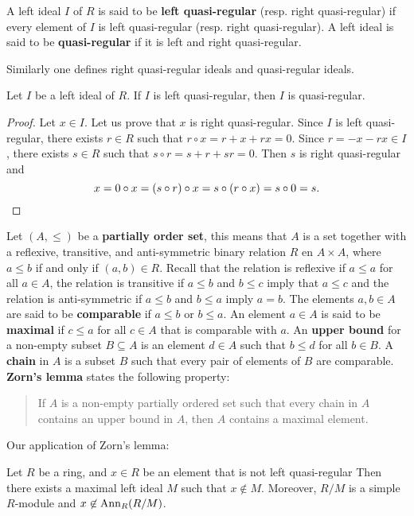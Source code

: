\begin{definition}
A left ideal $I$ of $R$ is said to be 
\textbf{left quasi-regular} (resp. right quasi-regular) if every element of $I$ is
left quasi-regular (resp. right quasi-regular). A left ideal 
is said to be \textbf{quasi-regular} if it is left and right quasi-regular. 
\end{definition}

Similarly 
one defines right quasi-regular ideals and quasi-regular ideals. 

\begin{lemma}
	\label{lemma:casiregular}
	Let $I$ be a left ideal of $R$. If $I$ is left quasi-regular, then 
	$I$ is quasi-regular.
\end{lemma}

\begin{proof}
	Let $x\in I$. Let us prove that $x$ is right quasi-regular. Since $I$ is
	left quasi-regular, there exists $r\in R$ such that $r\circ x=r+x+rx=0$. Since 
	$r=-x-rx\in I$, there exists $s\in R$ such that $s\circ
	r=s+r+sr=0$. Then $s$ is right quasi-regular and  
	\[
	x=0\circ x=(s\circ r)\circ x=s\circ (r\circ x)=s\circ 0=s.\qedhere
	\]
\end{proof}

Let $(A,\leq)$ be a \textbf{partially order set}, this means that $A$ is a set together with a 
reflexive, transitive, and anti-symmetric binary relation
$R$ en $A\times A$, where $a\leq b$ if and only if $(a,b)\in R$. 
Recall that the relation is reflexive if $a\leq a$ for all $a\in A$, the relation is transitive if 
$a\leq b$ and $b\leq c$ imply that 
$a\leq c$ and the relation is anti-symmetric if $a\leq b$ and $b\leq a$ imply $a=b$.
The elements $a,b\in A$ are said to be \textbf{comparable} if $a\leq b$ or $b\leq
a$. An element $a\in A$ is said to be \textbf{maximal} if 
$c\leq a$ 
for all $c\in A$
that is comparable with $a$. 
An \textbf{upper bound} for a non-empty subset $B\subseteq A$ is an element $d\in
A$ such that $b\leq d$ for all $b\in B$. A \textbf{chain} in $A$ is a subset 
$B$ such that every pair of elements of $B$ are comparable. 
\textbf{Zorn's lemma} states the following property: 
\begin{quote}
If $A$ is a non-empty partially ordered set such that every chain in 
$A$ contains an upper bound in $A$, then $A$ contains a maximal element. 
\end{quote}

Our application of Zorn's lemma:

\begin{lemma}
	\label{lemma:maxreg}
	Let $R$ be a ring, and $x\in R$ be an element that is not left quasi-regular Then there
	exists a maximal left ideal $M$ such that 
	$x\not\in M$. Moreover, $R/M$ is a simple $R$-module and  
	$x\not\in\operatorname{Ann}_R(R/M)$.
\end{lemma}

